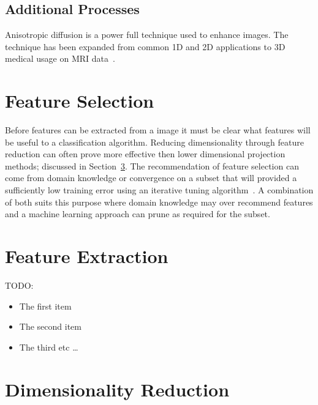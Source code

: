 \documentclass[journal]{IEEEtran}
\begin{document}
\subsection{Additional Processes}
Anisotropic diffusion is a power full technique used to enhance images.
The technique has been expanded from common 1D and 2D applications to 3D medical usage on MRI data~\cite{grieg92nonlinear}.





\section{Feature Selection}
\label{sec:selection}
Before features can be extracted from a image it must be clear what features will be useful to a classification algorithm.
Reducing dimensionality through feature reduction can often prove more effective then lower dimensional projection methods; discussed in Section~\ref{sec:reduce}.
The recommendation of feature selection can come from domain knowledge or convergence on a subset that will provided a sufficiently low training error using an iterative tuning algorithm~\cite{bu07feature,li10tumor}.
A combination of both suits this purpose where domain knowledge may over recommend features and a machine learning approach can prune as required for the subset.  










\section{Feature Extraction}
\label{sec:extraction}


TODO:


\begin{itemize}
  \item The first item
  \item The second item
  \item The third etc \ldots
\end{itemize}






\section{Dimensionality Reduction}
\label{sec:reduce}
\end{document}
